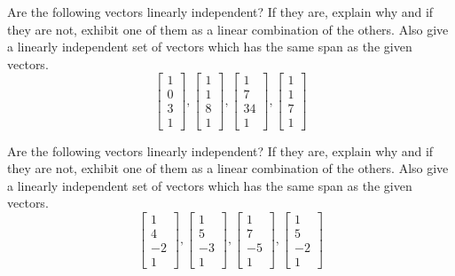 \documentclass{ximera}
\begin{document}
\begin{problem}\label{prb:3.21} Are the following vectors linearly independent? If they are, explain
why and if they are not, exhibit one of them as a linear combination of the
others. Also give a linearly independent set of vectors which has the same
span as the given vectors.
\begin{equation*}
\left[
\begin{array}{r}
1 \\
0 \\
3 \\
1
\end{array}
\right] ,\left[
\begin{array}{r}
1 \\
1 \\
8 \\
1
\end{array}
\right] ,\left[
\begin{array}{r}
1 \\
7 \\
34 \\
1
\end{array}
\right] ,\left[
\begin{array}{r}
1 \\
1 \\
7 \\
1
\end{array}
\right]
\end{equation*}
\end{problem}

\begin{problem}\label{prb:3.22} Are the following vectors linearly independent? If they are, explain
why and if they are not, exhibit one of them as a linear combination of the
others. Also give a linearly independent set of vectors which has the same
span as the given vectors.
\begin{equation*}
\left[
\begin{array}{r}
1 \\
4 \\
-2 \\
1
\end{array}
\right] ,\left[
\begin{array}{r}
1 \\
5 \\
-3 \\
1
\end{array}
\right] ,\left[
\begin{array}{r}
1 \\
7 \\
-5 \\
1
\end{array}
\right] ,\left[
\begin{array}{r}
1 \\
5 \\
-2 \\
1
\end{array}
\right]
\end{equation*}
\end{problem}
\end{document}
